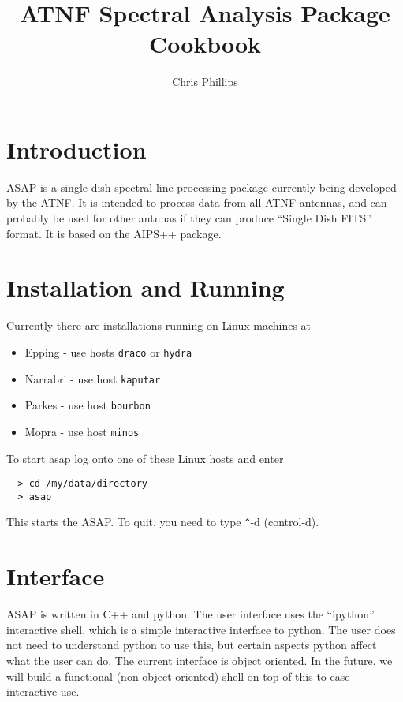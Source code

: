 \documentclass[11pt]{article}
\title{ATNF Spectral Analysis Package\\Cookbook }
\author{Chris Phillips}
\begin{document}
\maketitle

\section{Introduction}

ASAP is a single dish spectral line processing package currently being
developed by the ATNF. It is intended to process data from all ATNF
antennas, and can probably be used for other antnnas if they can
produce ``Single Dish FITS'' format. It is based on the AIPS++
package.



\section{Installation and Running}

Currently there are installations running on Linux machines at 

\begin{itemize}
\item Epping - use hosts {\tt draco} or {\tt hydra}
\item Narrabri - use host {\tt kaputar}
\item Parkes - use host {\tt bourbon}
\item Mopra - use host {\tt minos}
\end{itemize}

To start asap log onto one of these Linux hosts and  enter

\begin{verbatim}
  > cd /my/data/directory
  > asap
\end{verbatim}

This starts the ASAP. To quit, you need to type \verb+^+-d
(control-d).

\section{Interface}

ASAP is written in C++ and python. The user interface uses the
``ipython'' interactive shell, which is a simple interactive interface
to python. The user does not need to understand python to use this,
but certain aspects python affect what the user can do.  The current
interface is object oriented.  In the future, we will build a
functional (non object oriented) shell on top of this to ease
interactive use.
\end{document}
